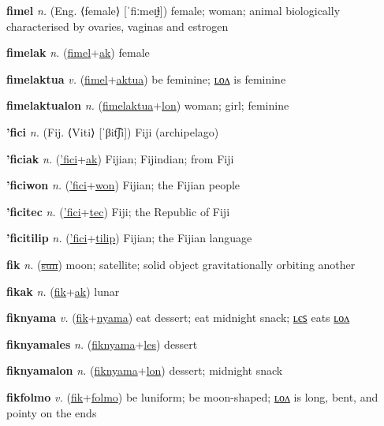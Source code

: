 \textbf{\hypertarget{fimel}{fimel}} \textit{n.} (Eng. ⟨female⟩ [ˈfiːmeɪ̯ɫ])
female; woman; animal biologically characterised by ovaries, vaginas and estrogen

\textbf{\hypertarget{fimelak}{fimelak}} \textit{n.} (\hyperlink{fimel}{fimel}+\allowbreak \hyperlink{ak}{ak})
female

\textbf{\hypertarget{fimelaktua}{fimelaktua}} \textit{v.} (\hyperlink{fimel}{fimel}+\allowbreak \hyperlink{aktua}{aktua})
be feminine; \hyperlink{fimelaktualon}{ʟᴏᴧ} is feminine

\textbf{\hypertarget{fimelaktualon}{fimelaktualon}} \textit{n.} (\hyperlink{fimelaktua}{fimelaktua}+\allowbreak \hyperlink{lon}{lon})
woman; girl; feminine

\textbf{\hypertarget{'fici}{'fici}} \textit{n.} (Fij. ⟨Viti⟩ [ˈβit͡ʃi])
Fiji (archipelago)

\textbf{\hypertarget{'ficiak}{'ficiak}} \textit{n.} (\hyperlink{'fici}{'fici}+\allowbreak \hyperlink{ak}{ak})
Fijian; Fijindian; from Fiji

\textbf{\hypertarget{'ficiwon}{'ficiwon}} \textit{n.} (\hyperlink{'fici}{'fici}+\allowbreak \hyperlink{won}{won})
Fijian; the Fijian people

\textbf{\hypertarget{'ficitec}{'ficitec}} \textit{n.} (\hyperlink{'fici}{'fici}+\allowbreak \hyperlink{tec}{tec})
Fiji; the Republic of Fiji

\textbf{\hypertarget{'ficitilip}{'ficitilip}} \textit{n.} (\hyperlink{'fici}{'fici}+\allowbreak \hyperlink{tilip}{tilip})
Fijian; the Fijian language

\textbf{\hypertarget{fik}{fik}} \textit{n.} (\hyperlink{sun}{\sout{sun}})
moon; satellite; solid object gravitationally orbiting another

\textbf{\hypertarget{fikak}{fikak}} \textit{n.} (\hyperlink{fik}{fik}+\allowbreak \hyperlink{ak}{ak})
lunar

\textbf{\hypertarget{fiknyama}{fiknyama}} \textit{v.} (\hyperlink{fik}{fik}+\allowbreak \hyperlink{nyama}{nyama})
eat dessert; eat midnight snack; \hyperlink{fiknyamales}{ʟєꜱ} eats \hyperlink{fiknyamalon}{ʟᴏᴧ}

\textbf{\hypertarget{fiknyamales}{fiknyamales}} \textit{n.} (\hyperlink{fiknyama}{fiknyama}+\allowbreak \hyperlink{les}{les})
dessert

\textbf{\hypertarget{fiknyamalon}{fiknyamalon}} \textit{n.} (\hyperlink{fiknyama}{fiknyama}+\allowbreak \hyperlink{lon}{lon})
dessert; midnight snack

\textbf{\hypertarget{fikfolmo}{fikfolmo}} \textit{v.} (\hyperlink{fik}{fik}+\allowbreak \hyperlink{folmo}{folmo})
be luniform; be moon-shaped; \hyperlink{fikfolmolon}{ʟᴏᴧ} is long, bent, and pointy on the ends

